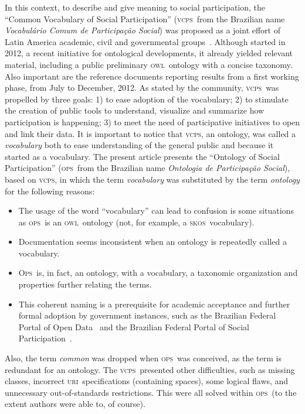 \documentclass[10pt,letterpaper]{article}
\newcommand{\ops}{\textsc{ops}}
\newcommand{\opsi}{O\textsc{ps}}
\newcommand{\vcps}{\textsc{vcps}}
\newcommand{\owl}{\textsc{owl}}
\newcommand{\skos}{\textsc{skos}}
\newcommand{\uri}{\textsc{uri}}
\begin{document}
In this context, to describe and give meaning to social participation, the ``Common Vocabulary of Social Participation'' (\vcps\ from the Brazilian name \emph{Vocabul\'ario Comum de Participa\c{c}\~ao Social}) was proposed as a joint effort of Latin America academic, civil and governmental groups~\cite{corais}. Although started in 2012, a recent initiative for ontological developments, it already yielded relevant material, including a public preliminary \owl\ ontology with a concise taxonomy. Also important are the reference documents reporting results from a first working phase, from July to December, 2012. 
As stated by the community, \vcps\ was propelled by three goals: 1) to ease adoption of the vocabulary; 2) to stimulate the creation of public tools to understand, visualize and summarize how participation is happening; 3) to meet the need of participative initiatives to open and link their data. 
It is important to notice that \vcps, an ontology, was called a \emph{vocabulary} both to ease understanding of the general public and because it started as a vocabulary. The present article presents the ``Ontology of Social Participation'' (\ops\ from the Brazilian name \emph{Ontologia de Participa\c{c}\~ao Social}), based on \vcps, in which the term \emph{vocabulary} was substituted by the term \emph{ontology} for the following reasons:

\begin{itemize}
    \item The usage of the word ``vocabulary'' can lead to confusion is some situations as \ops\ is an \owl\ ontology (not, for example, a \skos\ vocabulary).
    \item Documentation seems inconsistent when an ontology is repeatedly called a vocabulary.
    \item \opsi\ is, in fact, an ontology, with a vocabulary, a taxonomic organization and properties further relating the terms.
    \item This coherent naming is a prerequisite for academic acceptance and further formal adoption by government instances, such as the Brazilian Federal Portal of Open Data~\cite{dadosGov} and the Brazilian Federal Portal of Social Participation~\cite{participa}.
\end{itemize}

\noindent Also, the term \emph{common} was dropped when \ops\ was conceived, as the term is redundant for an ontology. The \vcps\ presented other difficulties, such as missing classes, incorrect \uri\ specifications (containing spaces), some logical flaws, and unnecessary out-of-standards restrictions. This were all solved within \ops\ (to the extent authors were able to, of course).
\end{document}
